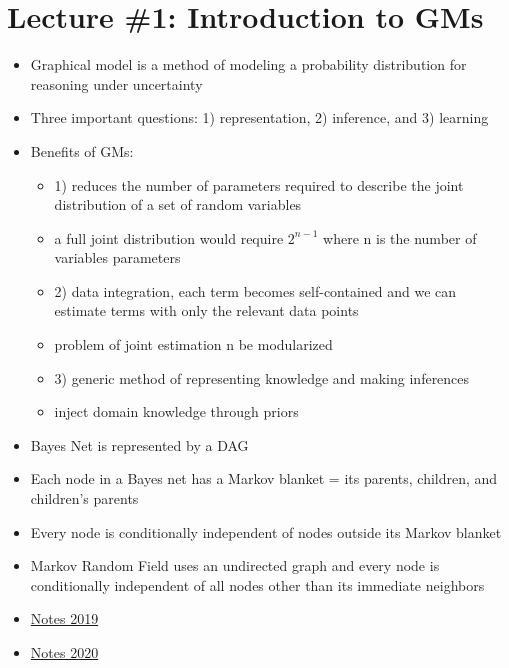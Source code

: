 \documentclass[../main.tex]{subfiles}
\begin{document}
\section{Lecture \#1: Introduction to GMs}
\begin{itemize}
  \item Graphical model is a method of modeling a probability distribution for reasoning under uncertainty
  \item Three important questions: 1) representation, 2) inference, and 3) learning
  \item Benefits of GMs:
  \begin{itemize}
    \item 1) reduces the number of parameters required to describe the joint distribution of a set of random variables
    \item a full joint distribution would require $2^{n - 1}$ where n is the number of variables parameters
    \item 2) data integration, each term becomes self-contained and we can estimate terms with only the relevant data points
    \item problem of joint estimation n be modularized
    \item 3) generic method of representing knowledge and making inferences
    \item inject domain knowledge through priors
  \end{itemize}
  \item Bayes Net is represented by a DAG
  \item Each node in a Bayes net has a Markov blanket = its parents, children, and children's parents
  \item Every node is conditionally independent of nodes outside its Markov blanket
  \item Markov Random Field uses an undirected graph and every node is conditionally independent of all nodes other than its immediate neighbors
  \item \href{https://sailinglab.github.io/pgm-spring-2019/notes/lecture-01/}{Notes 2019}
  \item \href{https://www.cs.cmu.edu/~epxing/Class/10708-20/lectures.html}{Notes 2020}
\end{itemize}
\end{document}
